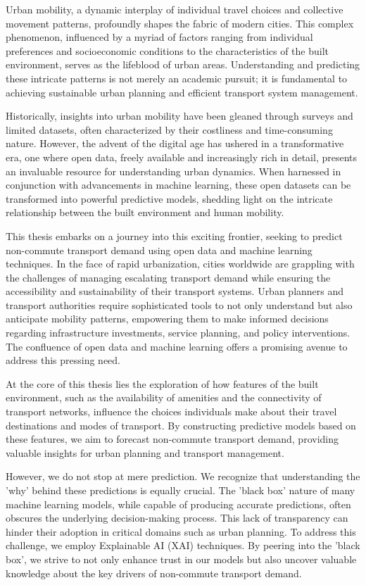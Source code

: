 Urban mobility, a dynamic interplay of individual travel choices and collective movement patterns, profoundly shapes the fabric of modern cities. This complex phenomenon, influenced by a myriad of factors ranging from individual preferences and socioeconomic conditions to the characteristics of the built environment, serves as the lifeblood of urban areas. Understanding and predicting these intricate patterns is not merely an academic pursuit; it is fundamental to achieving sustainable urban planning and efficient transport system management.

Historically, insights into urban mobility have been gleaned through surveys and limited datasets, often characterized by their costliness and time-consuming nature. However, the advent of the digital age has ushered in a transformative era, one where open data, freely available and increasingly rich in detail, presents an invaluable resource for understanding urban dynamics. When harnessed in conjunction with advancements in machine learning, these open datasets can be transformed into powerful predictive models, shedding light on the intricate relationship between the built environment and human mobility.

This thesis embarks on a journey into this exciting frontier, seeking to predict non-commute transport demand using open data and machine learning techniques. In the face of rapid urbanization, cities worldwide are grappling with the challenges of managing escalating transport demand while ensuring the accessibility and sustainability of their transport systems. Urban planners and transport authorities require sophisticated tools to not only understand but also anticipate mobility patterns, empowering them to make informed decisions regarding infrastructure investments, service planning, and policy interventions. The confluence of open data and machine learning offers a promising avenue to address this pressing need.

At the core of this thesis lies the exploration of how features of the built environment, such as the availability of amenities and the connectivity of transport networks, influence the choices individuals make about their travel destinations and modes of transport. By constructing predictive models based on these features, we aim to forecast non-commute transport demand, providing valuable insights for urban planning and transport management.

However, we do not stop at mere prediction. We recognize that understanding the 'why' behind these predictions is equally crucial. The 'black box' nature of many machine learning models, while capable of producing accurate predictions, often obscures the underlying decision-making process. This lack of transparency can hinder their adoption in critical domains such as urban planning. To address this challenge, we employ Explainable AI (XAI) techniques. By peering into the 'black box', we strive to not only enhance trust in our models but also uncover valuable knowledge about the key drivers of non-commute transport demand.

